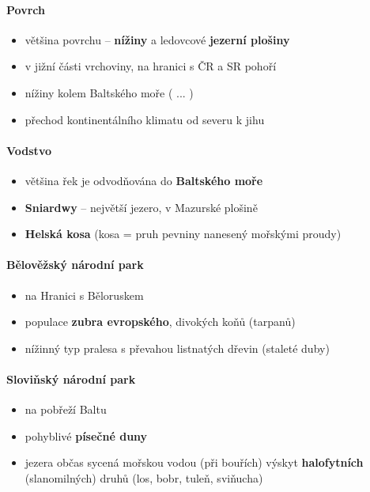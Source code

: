 \paragraph{Povrch}
\begin{itemize}
\item většina povrchu -- \textbf{nížiny} a ledovcové \textbf{jezerní plošiny}
\item v jižní části vrchoviny, na hranici s ČR a SR pohoří
\item nížiny kolem Baltského moře ( ... )
\item přechod kontinentálního klimatu od severu k jihu
\end{itemize}

\paragraph{Vodstvo}
\begin{itemize}
\item většina řek je odvodňována do \textbf{Baltského moře}
\item \textbf{Sniardwy} -- největší jezero, v Mazurské plošině
\item \textbf{Helská kosa} (kosa = pruh pevniny nanesený mořskými proudy)
\end{itemize}

\paragraph{Bělověžský národní park}
\begin{itemize}
\item na Hranici s Běloruskem
\item populace \textbf{zubra evropského}, divokých koňů (tarpanů)
\item nížinný typ pralesa s převahou listnatých dřevin (staleté duby)
\end{itemize}

\paragraph{Sloviňský národní park}
\begin{itemize}
\item na pobřeží Baltu
\item pohyblivé \textbf{písečné duny}
\item jezera občas sycená mořskou vodou (při bouřích) \ra výskyt \textbf{halofytních} (slanomilných) druhů (los, bobr, tuleň, sviňucha)
\end{itemize}


